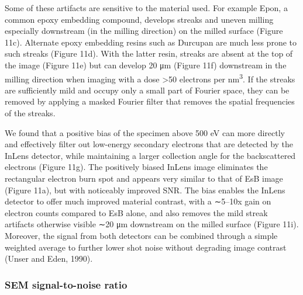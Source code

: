 \documentclass{article}
\begin{document}
Some of these artifacts are sensitive to the material used. For example Epon, a common epoxy embedding compound, develops streaks and uneven milling especially downstream (in the milling direction) on the milled surface (Figure 11c). Alternate epoxy embedding resins such as Durcupan are much less prone to such streaks (Figure 11d). With the latter resin, streaks are absent at the top of the image (Figure 11e) but can develop 20 μm (Figure 11f) downstream in the milling direction when imaging with a dose >50 electrons per nm\textsuperscript{3}. If the streaks are sufficiently mild and occupy only a small part of Fourier space, they can be removed by applying a masked Fourier filter that removes the spatial frequencies of the streaks.

We found that a positive bias of the specimen above 500 eV can more directly and effectively filter out low-energy secondary electrons that are detected by the InLens detector, while maintaining a larger collection angle for the backscattered electrons (Figure 11g). The positively biased InLens image eliminates the rectangular electron burn spot and appears very similar to that of EsB image (Figure 11a), but with noticeably improved SNR. The bias enables the InLens detector to offer much improved material contrast, with a ∼5–10x gain on electron counts compared to EsB alone, and also removes the mild streak artifacts otherwise visible ∼20 μm downstream on the milled surface (Figure 11i). Moreover, the signal from both detectors can be combined through a simple weighted average to further lower shot noise without degrading image contrast (Unser and Eden, 1990).

\subsubsection*{SEM signal-to-noise ratio}
\end{document}
